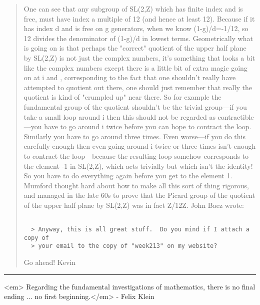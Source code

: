 \begin{quote}
 One can see that any subgroup of SL(2,Z) which has finite index and
 is free, must have index a multiple of 12 (and hence at least 12). Because
 if it has index d and is free on g generators, when we know (1-g)/d=-1/12,
 so 12 divides the denominator of (1-g)/d in lowest terms. Geometrically
 what is going on is that perhaps the "correct" quotient of the upper
 half plane by SL(2,Z) is not just the complex numbers, it's something that
 looks a bit like the complex numbers except there is a little bit of
 extra magic going on at i and \rho , corresponding to the fact that one
 shouldn't really have attempted to quotient out there, one should
 just remember that really the quotient is kind of "crumpled up"
 near there. So for example the fundamental group of the quotient
 shouldn't be the trivial group---if you take a small loop around i then
 this should not be regarded as contractible---you have to go around i
 twice before you can hope to contract the loop. Similarly you have to
 go around \rho  three times. Even worse---if you do this carefully enough
 then even going around i twice or \rho  three times isn't enough to
 contract the loop---because the resulting loop somehow corresponds
 to the element -1 in SL(2,Z), which acts trivially but which isn't
 the identity! So you have to do everything again before you
 get to the element 1. Mumford thought hard about how to make all this
 sort of thing rigorous, and managed in the late 60s to prove that the
 Picard group of the quotient of the upper half plane by SL(2,Z) was in
 fact Z/12Z.
 John Baez wrote:

\begin{verbatim}

  > Anyway, this is all great stuff.  Do you mind if I attach a copy of
  > your email to the copy of "week213" on my website?
\end{verbatim}
    
 Go ahead!
 Kevin
\end{quote}


\par\noindent\rule{\textwidth}{0.4pt}
<em>
Regarding the fundamental investigations of mathematics, there is 
no final ending ... no first beginning.</em> - Felix Klein

